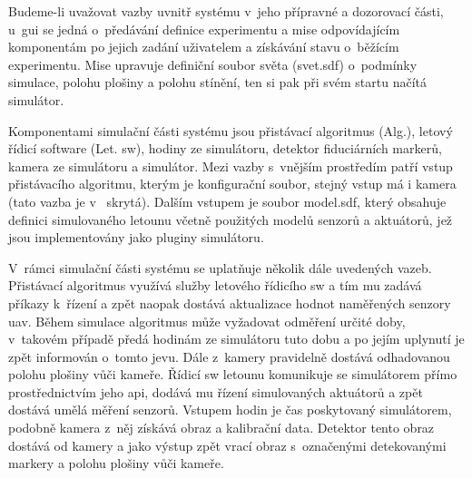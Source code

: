     Budeme-li uvažovat vazby uvnitř systému v~jeho přípravné a dozorovací části, u~\acrshort{gui} se jedná o~předávání definice experimentu a mise odpovídajícím komponentám po jejich zadání uživatelem a získávání stavu o~běžícím experimentu. Mise upravuje definiční soubor světa (svet.sdf) o~podmínky simulace, polohu plošiny a polohu stínění, ten si pak při svém startu načítá simulátor.

    Komponentami simulační části systému jsou přistávací algoritmus (Alg.), letový řídicí software (Let. \acrshort{sw}), hodiny ze simulátoru, detektor fiduciárních markerů, kamera ze simulátoru a simulátor. Mezi vazby s~vnějším prostředím patří vstup přistávacího algoritmu, kterým je konfigurační soubor, stejný vstup má i kamera (tato vazba je v~ skrytá). Dalším vstupem je soubor model.sdf, který obsahuje definici simulovaného letounu včetně použitých modelů senzorů a aktuátorů, jež jsou implementovány jako pluginy simulátoru.

    V~rámci simulační části systému se uplatňuje několik dále uvedených vazeb. Přistávací algoritmus využívá služby letového řídicího \acrshort{sw} a tím mu zadává příkazy k~řízení a zpět naopak dostává aktualizace hodnot naměřených senzory \acrshort{uav}. Během simulace algoritmus může vyžadovat odměření určité doby, v~takovém případě předá hodinám ze simulátoru tuto dobu a po jejím uplynutí je zpět informován o~tomto jevu. Dále z~kamery pravidelně dostává odhadovanou polohu plošiny vůči kameře. Řídicí \acrshort{sw} letounu komunikuje se simulátorem přímo prostřednictvím jeho \acrshort{api}, dodává mu řízení simulovaných aktuátorů a zpět dostává umělá měření senzorů. Vstupem hodin je čas poskytovaný simulátorem, podobně kamera z~něj získává obraz a kalibrační data. Detektor tento obraz dostává od kamery a jako výstup zpět vrací obraz s~označenými detekovanými markery a polohu plošiny vůči kameře.

